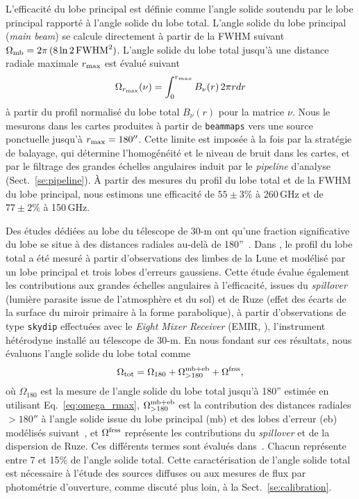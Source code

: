 L'efficacité du lobe principal est définie comme l'angle solide
soutendu par le lobe principal rapporté à l'angle solide du lobe
total. L'angle solide du lobe principal (\emph{main beam}) se calcule
directement à partir de la FWHM suivant $\Omega_{\rm{mb}} = 2\pi\,
(8\ln{2} \, \rm{FWHM}^2)$. L'angle solide du lobe
total jusqu'à une distance radiale maximale $r_{\rm{max}}$ est évalué suivant
\begin{equation}
  \Omega_{r_{\rm{max}}}(\nu) = \int_0^{r_{max}} B_{\nu}(r) \,  2 \pi r dr
  \label{eq:omega_rmax}
\end{equation}
à partir du profil normalisé du lobe total $B_{\nu}(r)$ pour la
matrice $\nu$. Nous le mesurons dans les cartes produites à partir de
{\tt beammaps} vers une source ponctuelle jusqu'à
$r_{\rm{max}}=180''$. Cette limite est imposée à la fois par la
stratégie de balayage, qui détermine l'homogénéité et le niveau de
bruit dans les cartes, et par le filtrage des grandes échelles
angulaires induit par le \emph{pipeline} d'analyse
(Sect.~\ref{se:pipeline}). \`A partir des mesures du profil du lobe
total et de la FWHM du lobe principal, nous estimons une efficacité de
$55 \pm 3\%$ à 260\,GHz et de $77 \pm 2\%$ à 150\,GHz.

Des études dédiées au lobe du télescope de 30-m ont qu'une
fraction significative du lobe se situe à des distances radiales au-delà
de 180''~\citep{Greve1998, Kramer2013}. Dans \citet{Kramer2013}, le
profil du lobe total a été mesuré à partir d'observations des limbes
de la Lune et modélisé par un lobe principal et trois lobes d'erreurs
gaussiens. Cette étude évalue également les contributions aux grandes échelles
angulaires à l'efficacité, issues du \emph{spillover}
(lumière parasite issue de l'atmosphère et du sol) et de Ruze (effet
des écarts de la surface du miroir primaire à la forme parabolique), à
partir d'observations de type {\tt skydip} effectuées avec le
\emph{Eight Mixer Receiver} (EMIR, \citet{Carter2012}),
l'instrument hétérodyne installé au télescope de 30-m. En nous fondant
sur ces résultats, nous évaluons l'angle solide du lobe total comme
\begin{equation}
  \Omega_{\rm{tot}} = \Omega_{180} + \Omega_{>180}^{\rm{mb+eb}} +
  \Omega^{\rm{frss}},
  \label{eq:omega_tot}
\end{equation}
où $\Omega_{180}$ est la mesure de l'angle solide du lobe total
jusqu'à 180'' estimée en utilisant Eq.~\ref{eq:omega_rmax},
$\Omega_{>180}^{\rm{mb+eb}}$ est la contribution des distances
radiales $>180''$ à l'angle solide issue du lobe principal (mb) et des
lobes d'erreur (eb) modélisés suivant~\citet{Kramer2013}, et
$\Omega^{\rm{frss}}$ représente les contributions du \emph{spillover}
et de la dispersion de Ruze. Ces différents termes sont évalués
dans~\citet{Perotto2019}. Chacun représente entre 7 et 15\% de l'angle
solide total. Cette caractérisation de l'angle solide total
est nécessaire à l'étude des sources diffuses ou aux mesures de flux
par photométrie d'ouverture, comme discuté plus loin, à la
Sect.~\ref{se:calibration}.


